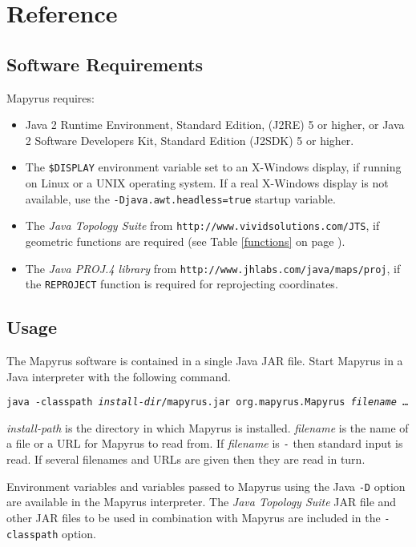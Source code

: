 
\section{Reference}

\subsection{Software Requirements}

Mapyrus requires:
\begin{itemize}
\item
Java 2 Runtime Environment, Standard Edition, (J2RE) 5 or higher,
or Java 2 Software Developers Kit, Standard Edition (J2SDK) 5 or higher.
\item
The \texttt{\$DISPLAY} environment variable set to an X-Windows display,
if running on Linux or a UNIX operating system.  If a real X-Windows display
is not available, use the \texttt{-Djava.awt.headless=true} startup variable.
\item
The \textit{Java Topology Suite} from \texttt{http://www.vividsolutions.com/JTS},
if geometric functions are required
(see Table \ref{functions} on page \pageref{functions}).
\item
The \textit{Java PROJ.4 library} from \texttt{http://www.jhlabs.com/java/maps/proj},
if the \texttt{REPROJECT} function is required for reprojecting coordinates.
\end{itemize}

\subsection{Usage}

The Mapyrus software is contained in a single Java JAR file.
Start Mapyrus in a Java interpreter with the following command.

\vspace{10pt}
\texttt{java -classpath \textit{install-dir}/mapyrus.jar org.mapyrus.Mapyrus \textit{filename} \dots}
\vspace{10pt}

\textit{install-path} is the directory in which
Mapyrus is installed.  \textit{filename} is the name of a file
or a URL for Mapyrus to read from.  If \textit{filename} is \texttt{-}
then standard input is read.  If several filenames and URLs are
given then they are read in turn.

Environment variables
and variables passed to Mapyrus using the Java \texttt{-D} option
are available in the Mapyrus interpreter.  The
\textit{Java Topology Suite} JAR file and other JAR files
to be used in combination with Mapyrus are included in the
\texttt{-classpath} option.

